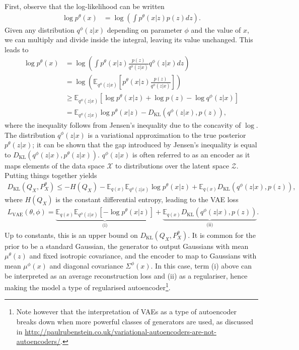 First, observe that the log-likelihood can be written 
%
\begin{align*}
\log p^\theta(x) &= \log \left( \int p^\theta(x|z) p(z) dz \right).
\end{align*}
%
Given any distribution $q^\phi(z|x)$ depending on parameter $\phi$ and the value of $x$, we can multiply and divide inside the integral, leaving its value unchanged.
This leads to
%
\begin{align*}
\log p^\theta(x) &= \log \left( \int p^\theta(x|z) \frac{p(z)}{q^\phi(z|x)} q^\phi(z|x) dz \right) \\
&= \log \left( \mathbb{E}_{q^\phi(z|x)} \left[  p^\theta(x|z) \frac{p(z)}{q^\phi(z|x)} \right]\right) \\
&\geq \mathbb{E}_{q^\phi(z|x)} \left[ \log p^\theta(x|z) + \log p(z) - \log q^\phi(z|x) \right] \\
&= \mathbb{E}_{q^\phi(z|x)} \log p^\theta(x|z)  - D_{\text{KL}}\left(q^\phi(z|x), p(z)\right),
\end{align*}
%
where the inequality follows from Jensen's inequality due to the concavity of $\log$.
The distribution $q^\phi(z|x)$ is a variational approximation to the true posterior $p^\theta(z|x)$; it can be shown that the gap introduced by Jensen's inequality is equal to $D_{\text{KL}}\left(q^\phi(z|x), p^\theta(z|x)\right)$. 
$q^\phi(z|x)$ is often referred to as an encoder as it maps elements of the data space $\mathcal{X}$ to distributions over the latent space $\mathcal{Z}$.
Putting things together yields
%
\begin{align*}
D_{\text{KL}}(Q_X, P^\theta_X) \leq -H(Q_X)  - \mathbb{E}_{q(x)} \mathbb{E}_{q^\phi(z|x)} \log p^\theta(x|z) + \mathbb{E}_{q(x)}D_{\text{KL}}\left(q^\phi(z|x), p(z)\right),
\end{align*}
%
where $H(Q_X)$ is the constant differential entropy, leading to the VAE loss
%
\begin{align}
L_{\text{VAE}}(\theta, \phi) =  \underbrace{\mathbb{E}_{q(x)} \mathbb{E}_{q^\phi(z|x)} \left[ - \log p^\theta(x|z)\right]}_{\text{(i)}} + \underbrace{\mathbb{E}_{q(x)}D_{\text{KL}}\left(q^\phi(z|x), p(z)\right)}_{\text{(ii)}}.
\end{align}
%
Up to constants, this is an upper bound on $D_{\text{KL}}(Q_X, P^\theta_X)$.
It is common for the prior to be a standard Gaussian, the generator to output Gaussians with mean $\mu^\theta(z)$ and fixed isotropic covariance, and the encoder to map to Gaussians with mean $\mu^\phi(x)$ and diagonal covariance $\Sigma^\phi(x)$.
In this case, term (i) above can be interpreted as an average reconstruction loss and (ii) as a regulariser, hence making the model a type of regularised autoencoder\footnote{Note however that the interpretation of VAEs as a type of autoencoder breaks down when more powerful classes of generators are used, as discussed in \href{http://paulrubenstein.co.uk/variational-autoencoders-are-not-autoencoders/}{http://paulrubenstein.co.uk/variational-autoencoders-are-not-autoencoders/}.}.

